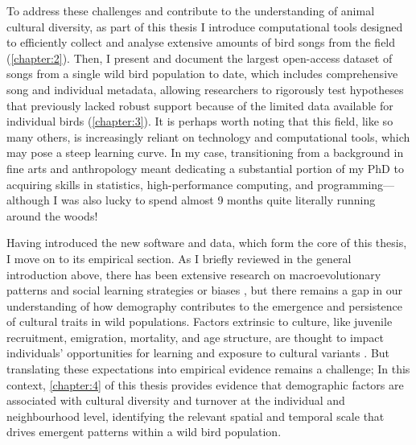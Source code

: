 To address these challenges and contribute to the understanding of animal cultural diversity, as part of this thesis I introduce computational tools designed to efficiently collect and analyse extensive amounts of bird songs from the field (\autoref{chapter:2}). Then, I present and document the largest open-access dataset of songs from a single wild bird population to date, which includes comprehensive song and individual metadata, allowing researchers to rigorously test hypotheses that previously lacked robust support because of the limited data available for individual birds (\autoref{chapter:3}). It is perhaps worth noting that this field, like so many others, is increasingly reliant on technology and computational tools, which may pose a steep learning curve. In my case, transitioning from a background in fine arts and anthropology meant dedicating a substantial portion of my PhD to acquiring skills in statistics, high-performance computing, and programming---although I was also lucky to spend almost 9 months quite literally running around the woods!

Having introduced the new software and data, which form the core of this thesis, I move on to its empirical section. As I briefly reviewed in the general introduction above, there has been extensive research on macroevolutionary patterns and social learning strategies or biases \parencite{pike2010, kendal2015, aplin2017, lachlan2018, tchernichovski2021}, but there remains a gap in our understanding of how demography contributes to the emergence and persistence of cultural traits in wild populations. Factors extrinsic to culture, like juvenile recruitment, emigration, mortality, and age structure, are thought to impact individuals' opportunities for learning and exposure to cultural variants \parencite{deffner2022a, deffner2022, kandler2023, fogarty2019, deffner2020, derex2016, kirby2021, nunn2009, barta2023}. But translating these expectations into empirical evidence remains a challenge; In this context, \autoref{chapter:4} of this thesis provides evidence that demographic factors are associated with cultural diversity and turnover at the individual and neighbourhood level, identifying the relevant spatial and temporal scale that drives emergent patterns within a wild bird population.

